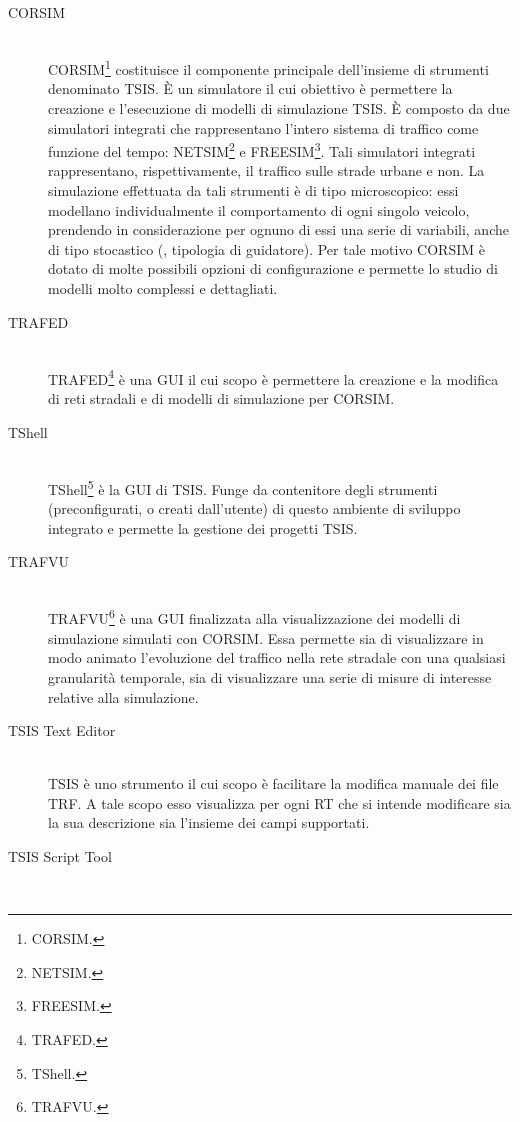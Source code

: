 \begin{description}
\item[CORSIM] \hfill \\
\acs{CORSIM}\footnote{\acf{CORSIM}.} costituisce il componente principale dell'insieme di strumenti denominato \acs{TSIS}. È un simulatore il cui obiettivo è permettere la creazione e l'esecuzione di modelli di simulazione \acs{TSIS}. È composto da due simulatori integrati che rappresentano l'intero sistema di traffico come funzione del tempo: \acs{NETSIM}\footnote{\acf{NETSIM}.} e \acs{FREESIM}\footnote{\acf{FREESIM}.}. Tali simulatori integrati rappresentano, rispettivamente, il traffico sulle strade urbane e non. La simulazione effettuata da tali strumenti è di tipo microscopico: essi modellano individualmente il comportamento di ogni singolo veicolo, prendendo in considerazione per ognuno di essi una serie di variabili, anche di tipo stocastico (\eg{}, tipologia di guidatore). Per tale motivo \acs{CORSIM} è dotato di molte possibili opzioni di configurazione e permette lo studio di modelli molto complessi e dettagliati.
\item[TRAFED] \hfill \\
\acs{TRAFED}\footnote{\acf{TRAFED}.} è una \acs{GUI} il cui scopo è permettere la creazione e la modifica di reti stradali e di modelli di simulazione per \acs{CORSIM}.
\item[TShell] \hfill \\
\acs{TShell}\footnote{\acf{TShell}.} è la \acs{GUI} di \acs{TSIS}. Funge da contenitore degli strumenti (preconfigurati, o creati dall'utente) di questo ambiente di sviluppo integrato e permette la gestione dei progetti \acs{TSIS}.
\item[TRAFVU] \hfill \\
\acs{TRAFVU}\footnote{\acf{TRAFVU}.} è una \acs{GUI} finalizzata alla visualizzazione dei modelli di simulazione simulati con \acs{CORSIM}. Essa permette sia di visualizzare in modo animato l'evoluzione del traffico nella rete stradale con una qualsiasi granularità temporale, sia di visualizzare una serie di misure di interesse relative alla simulazione.
\item[TSIS Text Editor] \hfill \\
\acs{TSIS}  è uno strumento il cui scopo è facilitare la modifica manuale dei file \acs{TRF}. A tale scopo esso visualizza per ogni \acs{RT} che si intende modificare sia la sua descrizione sia l'insieme dei campi supportati.
\item[TSIS Script Tool] \hfill \\

\end{description}
